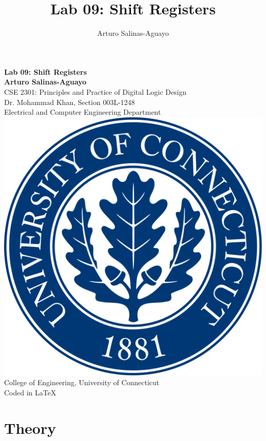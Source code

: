 \documentclass[12pt]{article}
\author{Arturo Salinas-Aguayo}
\title{Lab 09: Shift Registers}
\theoremstyle{definition}
\begin{document}
\newcommand{\closure}[2][3]{%
	{}\mkern#1mu\overline{\mkern-#1mu#2}}
\newcommand\ncoverline[1]{\mkern1mu\overline{\mkern-1mu#1\mkern-1mu}\mkern1mu}

\begin{titlepage}
	\centering
	\vspace*{3cm}
	\huge\textbf{Lab 09: Shift Registers}\\
	\vspace{5cm}
	\Large\textbf{Arturo Salinas-Aguayo}\\
	\normalsize
	CSE 2301: Principles and Practice of Digital Logic Design\\
	Dr. Mohammad Khan, Section 003L-1248\\
	Electrical and Computer Engineering Department
	\vfill
	\includegraphics[scale=0.1]{uconnlogo}\\
	College of Engineering, University of Connecticut\\
	\scriptsize{Coded in \LaTeX}
	\vspace*{1cm}
\end{titlepage}

\newpage

\section*{Theory}
\end{document}
